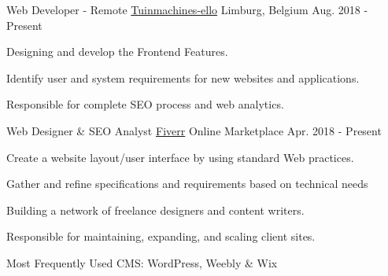 


\begin{cventries}


\cventry
{Web Developer - Remote} %
{\href{http://www.tuinmachines-ello.be/}{Tuinmachines-ello}} %
{Limburg, Belgium} %
{Aug. 2018 - Present} %
{ %
\begin{cvitems}
\item {Designing and develop the Frontend Features.}
\item {Identify user and system requirements for new websites and applications.}
\item {Responsible for complete SEO process and web analytics.}
\end{cvitems}
}

\hspace{2em}

\cventry
{Web Designer \& SEO Analyst} %
{\href{https://www.fiverr.com/muhammaduzair09}{Fiverr}} %
{Online Marketplace} %
{Apr. 2018 - Present} %
{ %
\begin{cvitems}
\item {Create a website layout/user interface by using standard Web practices.}
\item {Gather and refine specifications and requirements based on technical needs}
\item {Building a network of freelance designers and content writers.}
\item {Responsible for maintaining, expanding, and scaling client sites.}
\item { Most Frequently Used CMS: WordPress, Weebly \& Wix}
\end{cvitems}
}



\end{cventries}
